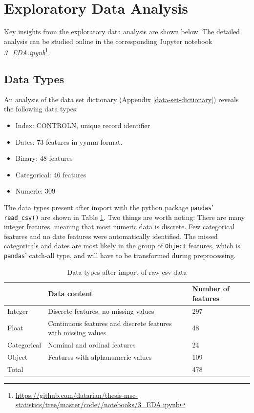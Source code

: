 \documentclass[
  11pt,
  a4paper,
  DIV=12,captions=tableheading,oneside,titlepage]{scrbook}
\providecommand{\tightlist}{%
  \setlength{\itemsep}{0pt}\setlength{\parskip}{0pt}}
\begin{document}
\hypertarget{exploratory-data-analysis}{%
\section{Exploratory Data Analysis}\label{exploratory-data-analysis}}

Key insights from the exploratory data analysis are shown below. The detailed analysis can be studied online in the corresponding Jupyter notebook \emph{3\_EDA.ipynb}\footnote{\url{https://github.com/datarian/thesis-msc-statistics/tree/master/code//notebooks/3_EDA.ipynb}}.

\hypertarget{data-types}{%
\subsection{Data Types}\label{data-types}}

An analysis of the data set dictionary (Appendix \ref{data-set-dictionary}) reveals the following data types:

\begin{itemize}
\tightlist
\item
  Index: CONTROLN, unique record identifier
\item
  Dates: 73 features in yymm format.
\item
  Binary: 48 features
\item
  Categorical: 46 features
\item
  Numeric: 309
\end{itemize}

The data types present after import with the python package \texttt{pandas}' \texttt{read\_csv()} are shown in Table \ref{tab:data-desc}. Two things are worth noting: There are many integer features, meaning that most numeric data is discrete. Few categorical features and no date features were automatically identified. The missed categoricals and dates are most likely in the group of \texttt{Object} features, which is \texttt{pandas}' catch-all type, and will have to be transformed during preprocessing.

\begin{table}[!h]

\caption{\label{tab:data-desc}Data types after import of raw csv data}
\centering
\begin{tabular}{l>{\raggedright\arraybackslash}p{6cm}l}
\toprule
  & Data content & Number of features\\
\midrule
Integer & Discrete features, no missing values & 297\\
Float & Continuous features and discrete features with missing values & 48\\
Categorical & Nominal and ordinal features & 24\\
Object & Features with alphanumeric values & 109\\
Total &  & 478\\
\bottomrule
\end{tabular}
\end{table}
\end{document}
